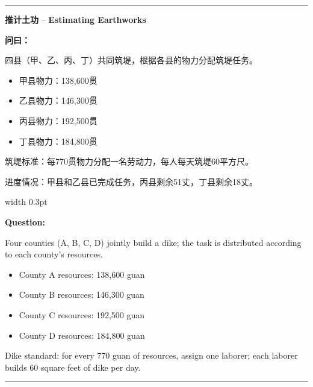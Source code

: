 \documentclass[10pt,a4paper]{article}
\newcommand{\cnlabel}[1]{\textcolor{labelcolor}{\textbf{#1}}}
\newcommand{\enlabel}[1]{\textcolor{labelcolor}{\textbf{#1}}}
\newenvironment{problemsection}{%
  \medskip\par\noindent\textcolor{rulecolor}{\rule{\textwidth}{0.4pt}}\par\smallskip%
}{\par\smallskip\noindent\textcolor{rulecolor}{\rule{\textwidth}{0.4pt}}\par\medskip}
\begin{document}
\begin{problemsection}

\noindent\begin{minipage}[t]{\textwidth}
\begin{center}
\textbf{推计土功} -- \textbf{Estimating Earthworks}
\end{center}
\end{minipage}

\vspace{0.3em}

\noindent\begin{minipage}[t]{0.47\textwidth}
\begin{flushleft}
\small
\cnlabel{问曰：}

四县（甲、乙、丙、丁）共同筑堤，根据各县的物力分配筑堤任务。

\begin{itemize}[leftmargin=*,nosep,topsep=2pt]
  \item 甲县物力：138,600贯
  \item 乙县物力：146,300贯
  \item 丙县物力：192,500贯
  \item 丁县物力：184,800贯
\end{itemize}

筑堤标准：每770贯物力分配一名劳动力，每人每天筑堤60平方尺。

进度情况：甲县和乙县已完成任务，丙县剩余51丈，丁县剩余18丈。
\end{flushleft}
\end{minipage}%
\hfill\vrule width 0.3pt\hfill%
\begin{minipage}[t]{0.47\textwidth}
\begin{flushleft}
\small
\enlabel{Question:}

Four counties (A, B, C, D) jointly build a dike; the task is distributed according to each county's resources.

\begin{itemize}[leftmargin=*,nosep,topsep=2pt]
  \item County A resources: 138,600 guan
  \item County B resources: 146,300 guan
  \item County C resources: 192,500 guan
  \item County D resources: 184,800 guan
\end{itemize}

Dike standard: for every 770 guan of resources, assign one laborer; each laborer builds 60 square feet of dike per day.


\end{flushleft}
\end{minipage}
\end{problemsection}
\end{document}
